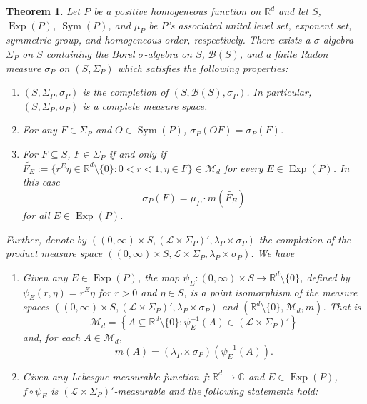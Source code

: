 \documentclass[11pt]{article}
\newtheorem{theorem}{Theorem}[section]
\theoremstyle{remark}
\newcommand\Sym{\operatorname{Sym}}
\newcommand\Exp{\operatorname{Exp}}
\begin{document}
\begin{theorem}\label{thm:BestIntegrationFormula} Let $P$ be a positive homogeneous function on $\mathbb{R}^d$ and let $S$, $\Exp(P)$, $\Sym(P)$, and $\mu_P$ be $P$'s associated unital level set, exponent set, symmetric group, and homogeneous order, respectively.
There exists a $\sigma$-algebra $\Sigma_P$ on $S$ containing the Borel $\sigma$-algebra on $S$, $\mathcal{B}(S)$,
and a finite Radon measure $\sigma_P$ on $(S,\Sigma_P)$ which satisfies the following properties:
\begin{enumerate}
\item\label{property:Completion} $(S,\Sigma_P,\sigma_P)$ is the completion of $(S,\mathcal{B}(S),\sigma_P)$. In particular, $(S,\Sigma_P,\sigma_P)$ is a complete measure space.
\item\label{property:Invariance} For any $F\in\Sigma_P$ and $O\in\Sym(P)$, $\sigma_P(OF)=\sigma_P(F)$.
\item\label{property:DefiningConditionofsigma} For $F\subseteq S$, $F\in\Sigma_P$ if and only if $\widetilde{F_E}:=\{r^E\eta\in\mathbb{R}^d\setminus\{0\}:0<r<1,\eta\in F\}\in\mathcal{M}_d$ for every $E\in \Exp(P)$. In this case
\begin{equation*}
    \sigma_P(F)=\mu_P\cdot m(\widetilde{F_E})
\end{equation*}
for all $E\in\Exp(P)$.
\end{enumerate}
Further, denote by $\left((0,\infty)\times S,(\mathcal{L}\times\Sigma_P)',\lambda_P\times\sigma_P\right)$ the completion of the product measure space $((0,\infty)\times S,\mathcal{L}\times\Sigma_P,\lambda_P\times\sigma_P)$. We have
\begin{enumerate}
\item\label{property:BestPointIsomorphism} Given any $E\in \Exp(P)$, the map $\psi_E:(0,\infty)\times S\to\mathbb{R}^d\setminus\{0\}$, defined by $\psi_E(r,\eta)=r^E\eta$ for $r>0$ and $\eta\in S$, is a point isomorphism of the measure spaces $\left((0,\infty)\times S,(\mathcal{L}\times\Sigma_P)',\lambda_P\times\sigma_P\right)$ and $(\mathbb{R}^d\setminus\{0\},\mathcal{M}_d,m)$. That is
\begin{equation*}
\mathcal{M}_d=\left\{A\subseteq \mathbb{R}^d\setminus\{0\}:\psi_E^{-1}(A)\in (\mathcal{L}\times\Sigma_P)'\right\}
\end{equation*}
and, for each $A\in\mathcal{M}_d$,
\begin{equation*}
m(A)=(\lambda_P\times\sigma_P)(\psi_E^{-1}(A)).
\end{equation*}
\item\label{property:BestIntegrationFormula} Given any Lebesgue measurable function $f:\mathbb{R}^d\to\mathbb{C}$ and $E\in \Exp(P)$, $f\circ \psi_E$ is $(\mathcal{L}\times\Sigma_P)'$-measurable and the following statements hold:

\end{enumerate}
\end{theorem}
\end{document}
